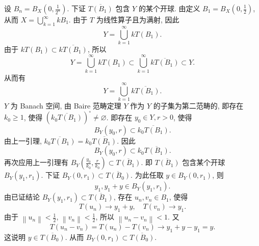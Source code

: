 \documentclass[openany]{ctexbook}
\makeatletter
\theoremstyle{kaiti}
\theoremstyle{normal}
\renewenvironment{proof}[1][\proofname]{\par
    \pushQED{\qed}%
    \normalfont \topsep6\p@\@plus6\p@\relax
    \trivlist
    \item\relax
    {\heiti #1}\hspace{2\labelsep}\ignorespaces
  }{%
    \popQED\endtrivlist\@endpefalse
  }
\makeatother
\begin{document}
\begin{proof}
设 $B_n=B_{X}\left(0, \frac{1}{2^n}\right)$. 下证 $\overline{T\left(B_1\right)}$ 包含 $Y$ 的某个开球. 由定义 $B_1=B_{X}\left(0, \frac{1}{2}\right)$, 从而 $X=\bigcup_{k=1}^{\infty} k B_1$. 由于 $T$ 为线性算子且为满射, 因此
$$
Y=\bigcup_{k=1}^{\infty} k T\left(B_1\right).
$$
由于 $k T\left(B_1\right) \subset \overline{k T\left(B_1\right)}$, 所以
$$
Y=\bigcup_{k=1}^{\infty} k T\left(B_1\right) \subset \bigcup_{k=1}^{\infty} \overline{k T\left(B_1\right)} \subset Y.
$$
从而有
$$
Y=\bigcup_{k=1}^{\infty} \overline{k T\left(B_1\right)}.
$$
$Y$ 为 Banach 空间, 由 Baire 范畴定理 $Y$ 作为 $Y$ 的子集为第二范畴的, 即存在 $k_0 \geqslant 1$, 使得
$\left(\overline{k_0 T\left(B_1\right)}\right)^{\circ} \neq \varnothing$. 即存在 $y_0 \in Y, r>0$, 使得
$$
B_{Y}\left(y_0, r\right) \subset \overline{k_0 T\left(B_1\right)}.
$$
由上一引理, $\overline{k_0 T\left(B_1\right)}=k_0 \overline{T\left(B_1\right)}$. 因此
$$
B_{Y}\left(y_0, r\right) \subset k_0 \overline{T\left(B_1\right)}.
$$
再次应用上一引理有 $B_{Y}\left(\frac{y_0}{k_0}, \frac{r}{k_0}\right) \subset \overline{T\left(B_1\right)}$. 即 $\overline{T\left(B_1\right)}$ 包含某个开球 $B_{Y}\left(y_1, r_1\right)$.
下证 $B_{Y}\left(0, r_1\right) \subset \overline{T\left(B_0\right)}$. 为此任取 $y \in B_{Y}\left(0, r_1\right)$, 则
$$
y_1, y_1+y \in B_{Y}\left(y_1, r_1\right).
$$
由已证结论 $B_{Y}\left(y_1, r_1\right) \subset \overline{T\left(B_1\right)}$, 存在 $u_n, v_n \in B_1$, 使得
$$
T\left(u_n\right) \rightarrow y_1+y, \quad T\left(v_n\right) \rightarrow y_1.
$$
由于 $\left\|u_n\right\|<\frac{1}{2}$, $\left\|v_n\right\|<\frac{1}{2}$, 所以 $\left\|u_n-v_n\right\|<1$. 又
$$
T\left(u_n-v_n\right)=T\left(u_n\right)-T\left(v_n\right) \rightarrow y_1+y-y_1=y.
$$
这说明 $y \in \overline{T\left(B_0\right)}$. 从而 $B_{Y}\left(0, r_1\right) \subset \overline{T\left(B_0\right)}$.


\end{proof}
\end{document}
